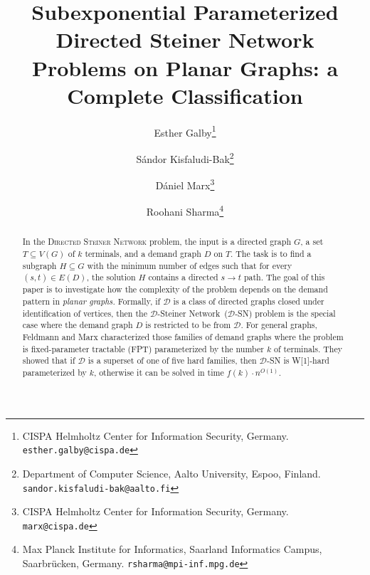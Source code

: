 \documentclass[a4paper,11pt]{article}
\title{Subexponential Parameterized Directed Steiner Network Problems on Planar Graphs: a Complete Classification}
\author{Esther Galby\thanks{CISPA Helmholtz Center for Information Security, Germany. \texttt{esther.galby@cispa.de}} \and S\' andor Kisfaludi-Bak\thanks{Department of Computer Science, Aalto University, Espoo, Finland. \texttt{sandor.kisfaludi-bak@aalto.fi}} \and D\' aniel Marx\thanks{CISPA Helmholtz Center for Information Security, Germany. \texttt{marx@cispa.de}}\and  Roohani Sharma\thanks{Max Planck Institute for Informatics, Saarland Informatics Campus, Saarbr\"ucken, Germany.  \texttt{rsharma@mpi-inf.mpg.de}}}
\date{}
\newcommand{\calD}{\mathcal{D}}
\theoremstyle{plain}
\newtheorem{identification rule}{Identification Rule}
\theoremstyle{definition}
\theoremstyle{remark}
\newcommand{\Dsngenfull}{{\sc $\calD$-Steiner Network}\xspace}
\newcommand{\Dsngen}{{\sc $\calD$-SN}\xspace}
\begin{document}
 \maketitle

\thispagestyle{empty}
\begin{abstract}
 In the \textsc{Directed Steiner Network} problem, the input is a directed graph $G$, a set $T\subseteq V(G)$ of $k$ terminals, and a demand graph $D$ on $T$. The task is to find a subgraph $H\subseteq G$ with the minimum number of edges such that for every $(s,t)\in E(D)$, the solution $H$ contains a directed $s\to t$ path. 
The goal of this paper is to investigate how the complexity of the problem depends on the demand pattern in \emph{planar graphs.} Formally, if $\mathcal{D}$ is a class of directed graphs closed under identification of vertices, then the \Dsngenfull\ (\Dsngen) problem is the special case where the demand graph $D$ is restricted to be from $\mathcal{D}$.
For general graphs, Feldmann and Marx \cite{FeldmannM16} characterized those families of demand graphs where the problem is fixed-parameter tractable (FPT) parameterized by the number $k$ of terminals. 
They showed that if $\calD$ is a superset of one of five hard families, then \Dsngen is W[1]-hard parameterized by $k$, otherwise it can be solved in time $f(k)\cdot n^{O(1)}$.


\end{abstract}
\end{document}
